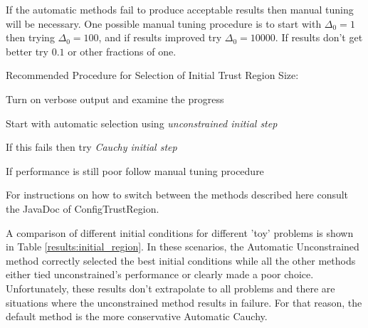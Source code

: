 If the automatic methods fail to produce acceptable results then manual tuning will be necessary. One possible manual tuning procedure is to start with $\Delta_0=1$ then trying $\Delta_0=100$, and if results improved try $\Delta_0=10000$. If results don't get better try $0.1$ or other fractions of one.

Recommended Procedure for Selection of Initial Trust Region Size:
\begin{enumargin}{0.2}
\item Turn on verbose output and examine the progress
\item Start with automatic selection using \emph{unconstrained initial step}
\item If this fails then try \emph{Cauchy initial step}
\item If performance is still poor follow manual tuning procedure
\end{enumargin}
For instructions on how to switch between the methods described here consult the JavaDoc of ConfigTrustRegion.

A comparison of different initial conditions for different 'toy' problems is shown in Table \ref{results:initial_region}. In these scenarios, the Automatic Unconstrained method correctly selected the best initial conditions while all the other methods either tied unconstrained's performance or clearly made a poor choice. Unfortunately, these results don't extrapolate to all problems and there are situations where the unconstrained method results in failure. For that reason, the default method is the more conservative Automatic Cauchy.

